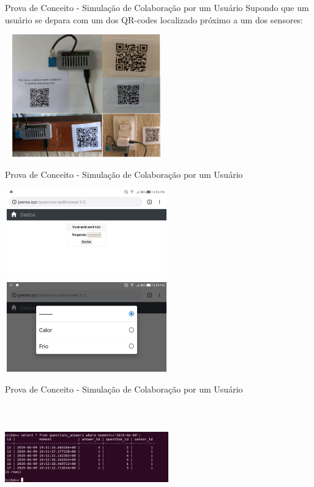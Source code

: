 \documentclass{beamer}
\begin{document}
    \begin{frame}{Prova de Conceito - Simulação de Colaboração por um Usuário}
      \quad Supondo que um usuário se depara com um dos QR-codes localizado próximo a um dos sensores:
      \begin{center}
      \includegraphics[height=150pt, width=200pt]{prova5}
      \end{center}
    \end{frame}
    \begin{frame}{Prova de Conceito - Simulação de Colaboração por um Usuário}
      \begin{center}
      \includegraphics[height=110pt, width=200pt]{prova6}
      \includegraphics[height=110pt, width=200pt]{prova7}
      \end{center}
    \end{frame}
    \begin{frame}{Prova de Conceito - Simulação de Colaboração por um Usuário}
      \begin{center}
        \includegraphics[height=130pt, width=200pt]{prova12}
      \end{center}
    \end{frame}
\end{document}
